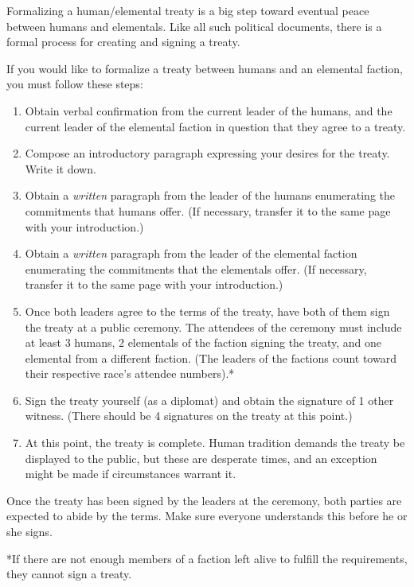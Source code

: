 \documentclass[green]{elementals}
\begin{document}
\name{\gTreaty{}}

Formalizing a human/elemental treaty is a big step toward eventual peace between humans and elementals. Like all such political documents, there is a formal process for creating and signing a treaty.

If you would like to formalize a treaty between humans and an elemental faction, you must follow these steps:
\begin{enumerate}
  \item Obtain verbal confirmation from the current leader of the humans, and the current leader of the elemental faction in question that they agree to a treaty.
  \item Compose an introductory paragraph expressing your desires for the treaty.  Write it down.
  \item Obtain a \emph{written} paragraph from the leader of the humans enumerating the commitments that humans offer. (If necessary, transfer it to the same page with your introduction.)
  \item Obtain a \emph{written} paragraph from the leader of the elemental faction enumerating the commitments that the elementals offer. (If necessary, transfer it to the same page with your introduction.)
  \item Once both leaders agree to the terms of the treaty, have both of them sign the treaty at a public ceremony.  The attendees of the ceremony must include at least 3 humans, 2 elementals of the faction signing the treaty, and one elemental from a different faction. (The leaders of the factions count toward their respective race's attendee numbers).*
  \item Sign the treaty yourself (as a diplomat) and obtain the signature of 1 other witness. (There should be 4 signatures on the treaty at this point.) 
  \item At this point, the treaty is complete. Human tradition demands the treaty be displayed to the public, but these are desperate times, and an exception might be made if circumstances warrant it.
\end{enumerate}

Once the treaty has been signed by the leaders at the ceremony, both parties are expected to abide by the terms. Make sure everyone understands this before he or she signs.

*If there are not enough members of a faction left alive to fulfill the requirements, they cannot sign a treaty.
\end{document}
